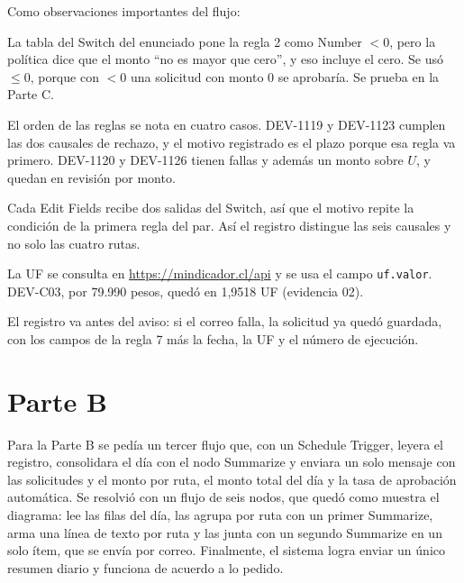 \documentclass{article}
\begin{document}
Como observaciones importantes del flujo:
\begin{compactitem}
\item La tabla del Switch del enunciado pone la regla 2 como Number $< 0$, pero la política
dice que el monto ``no es mayor que cero'', y eso incluye el cero. Se usó $\leq 0$, porque
con $< 0$ una solicitud con monto 0 se aprobaría. Se prueba en la Parte C.
\item El orden de las reglas se nota en cuatro casos. DEV-1119 y DEV-1123 cumplen las dos
causales de rechazo, y el motivo registrado es el plazo porque esa regla va primero. DEV-1120
y DEV-1126 tienen fallas y además un monto sobre $U$, y quedan en revisión por monto.
\item Cada Edit Fields recibe dos salidas del Switch, así que el motivo repite la condición de
la primera regla del par. Así el registro distingue las seis causales y no solo las cuatro
rutas.
\item La UF se consulta en \url{https://mindicador.cl/api} y se usa el campo
\texttt{uf.valor}. DEV-C03, por 79.990 pesos, quedó en 1,9518 UF (evidencia 02).
\item El registro va antes del aviso: si el correo falla, la solicitud ya quedó guardada, con
los campos de la regla 7 más la fecha, la UF y el número de ejecución.
\end{compactitem}

\section*{Parte B}
Para la Parte B se pedía un tercer flujo que, con un Schedule Trigger, leyera el registro,
consolidara el día con el nodo Summarize y enviara un solo mensaje con las solicitudes y el
monto por ruta, el monto total del día y la tasa de aprobación automática. Se resolvió con un
flujo de seis nodos, que quedó como muestra el diagrama: lee las filas del día, las agrupa por
ruta con un primer Summarize, arma una línea de texto por ruta y las junta con un segundo
Summarize en un solo ítem, que se envía por correo. Finalmente, el sistema logra enviar un único
resumen diario y funciona de acuerdo a lo pedido.

\begin{center}
\end{center}
\end{document}
